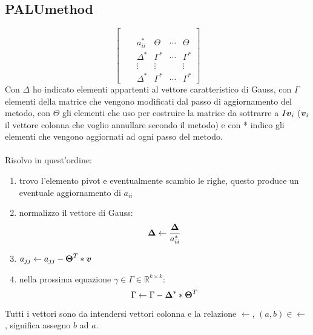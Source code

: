 \subsection{PALUmethod}
\label{subsection:PALUmethod}
\begin{oss}
\begin{displaymath}
\left [
\begin{array}{cccccc}
\\
\\
& & a_{ii}^{*} & \Theta & \cdots & \Theta   
	 \\ & & \Delta^{*} & \Gamma^{*} & \cdots & \Gamma^{*}
	 \\ & & \vdots & \vdots &  & \vdots
	 \\ & & \Delta^{*} & \Gamma^{*} & \cdots & \Gamma^{*}
\end{array}
\right ]
\end{displaymath}
Con $\Delta$ ho indicato elementi appartenti al vettore caratteristico di
Gauss, con $\Gamma$ elementi della matrice che vengono modificati dal
passo di aggiornamento del metodo, con $\Theta$ gli elementi che uso per
costruire la matrice da sottrarre a $I\boldsymbol{v}_{i}$ ($\boldsymbol{v}_{i}$ il vettore 
colonna che voglio annullare secondo il metodo) e con * indico gli elementi che
vengono aggiornati ad ogni passo del metodo.
\\ \\
Risolvo in quest'ordine:
\begin{enumerate}
  \item trovo l'elemento pivot e eventualmente scambio le righe, questo produce
  	un eventuale aggiornamento di $a_{ii}$
  \item normalizzo il vettore di Gauss:
  	\begin{displaymath}\boldsymbol{\Delta} \leftarrow
  		\frac{\boldsymbol{\Delta}}{a_{ii}^{*}}
	\end{displaymath}
  \item $a_{jj} \leftarrow a_{jj} - \boldsymbol{\Theta}^{T} * \boldsymbol{v}$
  \item nella prossima equazione $\gamma \in \Gamma \in \mathbb{R}^{k \times
  k}$:
  \begin{displaymath}
	  \Gamma \leftarrow \Gamma - \boldsymbol{\Delta}^{*} * \boldsymbol{\Theta}^{T}
  \end{displaymath}
\end{enumerate}
Tutti i vettori sono da intendersi vettori colonna e la relazione $\leftarrow$,
$(a, b) \in \leftarrow$, significa assegno $b$ ad $a$.
\end{oss}


